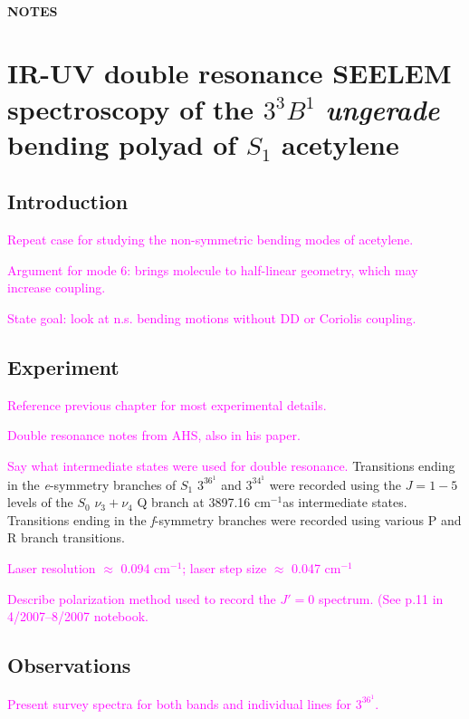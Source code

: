 \documentclass[12pt,draft]{mitthesis}
\newcommand{\POINT}[1]{\textcolor{magenta}{#1}}
\newcommand{\rcm}{cm$^{-1}$}
\begin{document}
\tableofcontents
\clearpage

\subsubsection*{NOTES}
\clearpage

\chapter{IR-UV double resonance SEELEM spectroscopy of the $3^3B^1$
  \emph{ungerade} bending polyad of $S_1$ acetylene}

\section{Introduction}

\POINT{Repeat case for studying the non-symmetric bending modes of
  acetylene.}

\POINT{Argument for mode 6: brings molecule to half-linear geometry,
  which may increase coupling.}

\POINT{State goal: look at n.s. bending motions without DD or Coriolis
  coupling.}


\section{Experiment}

\POINT{Reference previous chapter for most experimental details.}

\POINT{Double resonance notes from AHS, also in his paper.}

\POINT{Say what intermediate states were used for double resonance.}
Transitions ending in the \emph{e}-symmetry branches of $S_1$ $3^36^1$
and $3^34^1$ were recorded using the $J=1-5$ levels of the $S_0$
$\nu_3+\nu_4$ Q branch at 3897.16 \rcm as intermediate states.
Transitions ending in the \emph{f}-symmetry branches were recorded
using various P and R branch transitions.

\POINT{Laser resolution $\approx$ 0.094 \rcm; laser step size
  $\approx$ 0.047 \rcm }

\POINT{Describe polarization method used to record the $J'=0$
  spectrum.  (See p.11 in 4/2007--8/2007 notebook.}

\section{Observations}

\POINT{Present survey spectra for both bands and individual lines for
  $3^36^1$.}
\end{document}
